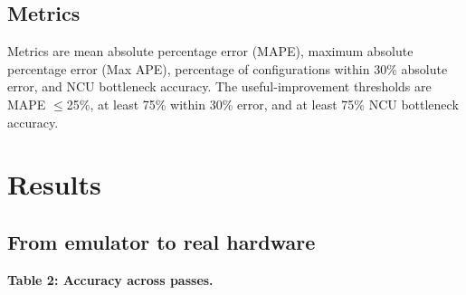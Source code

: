 \documentclass[
  11pt,
]{article}
\begin{document}
\subsection{Metrics}\label{metrics}

Metrics are mean absolute percentage error (MAPE), maximum absolute
percentage error (Max APE), percentage of configurations within 30\%
absolute error, and NCU bottleneck accuracy. The useful-improvement
thresholds are MAPE $\le$25\%, at least 75\% within 30\% error, and
at least 75\% NCU bottleneck accuracy.

\section{Results}\label{results}

\subsection{From emulator to real
hardware}\label{from-emulator-to-real-hardware}

\textbf{Table 2: Accuracy across passes.}
\end{document}
